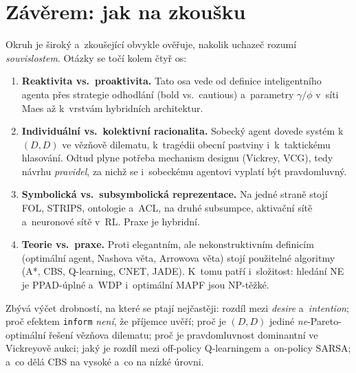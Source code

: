 \documentclass[11pt,a4paper]{article}
\theoremstyle{definition}
\begin{document}
\section*{Závěrem: jak na zkoušku}

Okruh je široký a~zkoušející obvykle ověřuje, nakolik uchazeč rozumí \emph{souvislostem}.
Otázky se točí kolem čtyř os:
\begin{enumerate}
\item \textbf{Reaktivita vs.\ proaktivita.} Tato osa vede od definice inteligentního agenta
  přes strategie odhodlání (bold vs.\ cautious) a~parametry $\gamma/\phi$ v~síti Maes až
  k~vrstvám hybridních architektur.
\item \textbf{Individuální vs.\ kolektivní racionalita.} Sobecký agent dovede systém k~$(D,D)$
  ve vězňově dilematu, k~tragédii obecní pastviny i~k~taktickému hlasování. Odtud plyne
  potřeba mechanism designu (Vickrey, VCG), tedy návrhu \emph{pravidel}, za nichž se
  i~sobeckému agentovi vyplatí být pravdomluvný.
\item \textbf{Symbolická vs.\ subsymbolická reprezentace.} Na jedné straně stojí FOL, STRIPS,
  ontologie a~ACL, na druhé subsumpce, aktivační sítě a~neuronové sítě v~RL. Praxe je
  hybridní.
\item \textbf{Teorie vs.\ praxe.} Proti elegantním, ale nekonstruktivním definicím
  (optimální agent, Nashova věta, Arrowova věta) stojí použitelné algoritmy (A*, CBS,
  Q-learning, CNET, JADE). K~tomu patří i~složitost: hledání NE je PPAD-úplné a~WDP
  i~optimální MAPF jsou NP-těžké.
\end{enumerate}

Zbývá výčet drobností, na které se ptají nejčastěji: rozdíl mezi \emph{desire}
a~\emph{intention}; proč efektem \texttt{inform} \emph{není}, že příjemce uvěří; proč je
$(D,D)$ jediné \emph{ne}-Pareto-optimální řešení vězňova dilematu; proč je pravdomluvnost
dominantní ve Vickreyově aukci; jaký je rozdíl mezi off-policy Q-learningem a~on-policy SARSA;
a~co dělá CBS na vysoké a~co na nízké úrovni.
\end{document}
